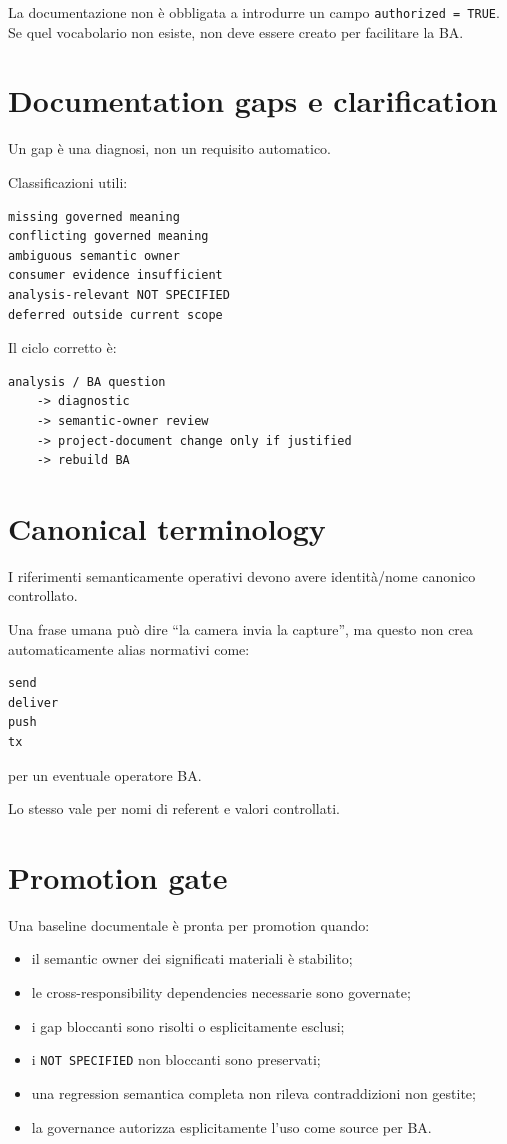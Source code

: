 \documentclass[11pt,a4paper]{article}
\newcommand{\code}[1]{\nolinkurl{#1}}
\begin{document}
La documentazione non è obbligata a introdurre un campo \code{authorized = TRUE}. Se quel vocabolario non esiste, non deve essere creato per facilitare la BA.

\section{Documentation gaps e clarification}

Un gap è una diagnosi, non un requisito automatico.

Classificazioni utili:

\begin{lstlisting}
missing governed meaning
conflicting governed meaning
ambiguous semantic owner
consumer evidence insufficient
analysis-relevant NOT SPECIFIED
deferred outside current scope
\end{lstlisting}

Il ciclo corretto è:

\begin{lstlisting}
analysis / BA question
    -> diagnostic
    -> semantic-owner review
    -> project-document change only if justified
    -> rebuild BA
\end{lstlisting}

\section{Canonical terminology}

I riferimenti semanticamente operativi devono avere identità/nome canonico controllato.

Una frase umana può dire ``la camera invia la capture'', ma questo non crea automaticamente alias normativi come:

\begin{lstlisting}
send
deliver
push
tx
\end{lstlisting}

per un eventuale operatore BA.

Lo stesso vale per nomi di referent e valori controllati.

\section{Promotion gate}

Una baseline documentale è pronta per promotion quando:

\begin{itemize}
\item il semantic owner dei significati materiali è stabilito;
\item le cross-responsibility dependencies necessarie sono governate;
\item i gap bloccanti sono risolti o esplicitamente esclusi;
\item i \code{NOT SPECIFIED} non bloccanti sono preservati;
\item una regression semantica completa non rileva contraddizioni non gestite;
\item la governance autorizza esplicitamente l'uso come source per BA.
\end{itemize}
\end{document}
